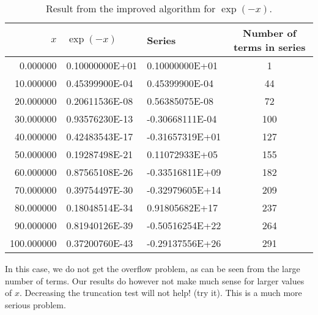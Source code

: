 \begin{table}[hbtp]
\label{num-tab2}
\begin{center}
\begin{tabular}{rllc}\\\hline
$x$&$\exp{(-x)}$&Series&Number of terms in series\\\hline
    0.000000&   0.10000000E+01&  0.10000000E+01&       1\\
   10.000000&   0.45399900E-04&  0.45399900E-04&      44\\
   20.000000&   0.20611536E-08&  0.56385075E-08&       72\\
   30.000000&   0.93576230E-13& -0.30668111E-04&      100\\
   40.000000&   0.42483543E-17& -0.31657319E+01&     127\\
   50.000000&   0.19287498E-21&  0.11072933E+05&     155\\
   60.000000&   0.87565108E-26& -0.33516811E+09&     182\\
   70.000000&   0.39754497E-30& -0.32979605E+14&     209\\
   80.000000&   0.18048514E-34&  0.91805682E+17&     237\\
   90.000000&   0.81940126E-39& -0.50516254E+22&     264\\
  100.000000&   0.37200760E-43& -0.29137556E+26&     291 \\\hline   
\end{tabular}  
\caption{Result  from the improved algorithm for $\exp{(-x)}$.}
\end{center}
\end{table} 
%
In this case, we do not get the overflow problem, as can be seen
from the large number of terms. Our results do however
not make much sense for larger values of $x$. Decreasing  the truncation test
will not help! (try it).  This is a much more serious problem.

